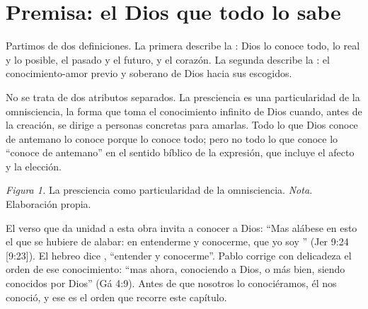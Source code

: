 
\section{Premisa: el Dios que todo lo sabe}

Partimos de dos definiciones. La primera describe la : Dios lo conoce todo, lo real y lo posible, el pasado y el futuro, y el corazón. La segunda describe la : el conocimiento-amor previo y soberano de Dios hacia sus escogidos.

No se trata de dos atributos separados. La presciencia es una particularidad de la omnisciencia, la forma que toma el conocimiento infinito de Dios cuando, antes de la creación, se dirige a personas concretas para amarlas. Todo lo que Dios conoce de antemano lo conoce porque lo conoce todo; pero no todo lo que conoce lo ``conoce de antemano'' en el sentido bíblico de la expresión, que incluye el afecto y la elección.

\begin{center}
\par
{\footnotesize\color{gris}\textit{Figura 1.} La presciencia como particularidad de la omnisciencia. \textit{Nota.} Elaboración propia.}
\end{center}

El verso que da unidad a esta obra invita a conocer a Dios: ``Mas alábese en esto el que se hubiere de alabar: en entenderme y conocerme, que yo soy \SENOR'' (Jer 9:24 [9:23]). El hebreo dice , ``entender y conocerme''. Pablo corrige con delicadeza el orden de ese conocimiento: ``mas ahora, conociendo a Dios, o más bien, siendo conocidos por Dios'' (Gá 4:9). Antes de que nosotros lo conociéramos, él nos conoció, y ese es el orden que recorre este capítulo.

